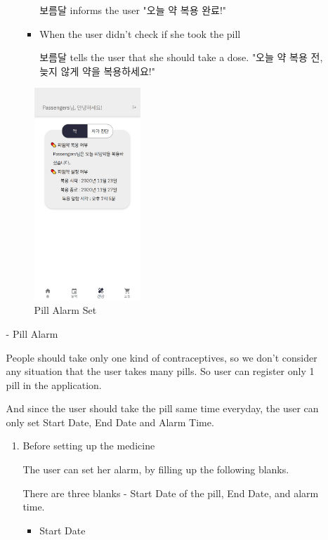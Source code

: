 \documentclass[conference]{IEEEtran}
\begin{document}
\begin{itemize}
\begin{enumerate}
\begin{enumerate}
\begin{itemize}
                보름달 informs the user "오늘 약 복용 완료!"
                \item When the user didn't check if she took the pill
                
                보름달 tells the user that she should take a dose. 
                "오늘 약 복용 전, 늦지 않게 약을 복용하세요!"
            \end{itemize}
        \end{enumerate} 
        \begin{figure}[ht]
        \includegraphics[width=4cm, height=8cm, center]{alarmsett.png}
        \caption{Pill Alarm Set}
        \label{fig29}
        \end{figure}
        - Pill Alarm

        People should take only one kind of contraceptives, so we don’t consider any situation that the user takes many pills. So user can register only 1 pill in the application.
        
        And since the user should take the pill same time everyday, the user can only set Start Date, End Date and Alarm Time.
        
        \begin{enumerate}
            \item Before setting up the medicine
            
            \setlength{\parindent}{2ex} The user can set her alarm, by filling up the following blanks.
            
            \setlength{\parindent}{2ex} There are three blanks - Start Date of the pill, End Date, and alarm time.
            \begin{itemize}
                \item Start Date
                

\end{itemize}
\end{enumerate}
\end{enumerate}
\end{itemize}
\end{document}
